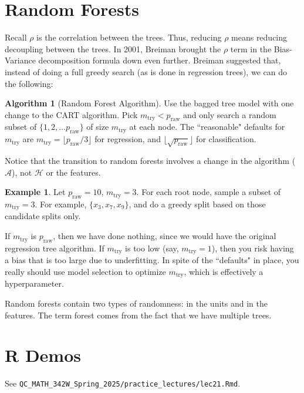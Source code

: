 \documentclass[12pt, a4paper]{article}
\theoremstyle{definition}
\newtheorem*{example}{Example}
\newtheorem{algorithm}{Algorithm}
\begin{document}
	\section*{Random Forests}
	Recall $\rho$ is the correlation between the trees. Thus, reducing $\rho$ means
	reducing decoupling between the trees. In 2001, Breiman brought the $\rho$ term in
	the Bias-Variance decomposition formula down even further. Breiman suggested that,
	instead of doing a full greedy search (as is done in regression trees), we can do
	the following:
	\begin{tcolorbox}
		\begin{algorithm}[Random Forest Algorithm]
			Use the bagged tree model with one change to the CART algorithm.
			Pick $m_{\text{try}} < p_{\text{raw}}$ and only search a random subset
			of $\{1,2,\ldots p_{\text{raw}}\}$ of size $m_{\text{try}}$ at each node.
			The ``reasonable" defaults for $m_{\text{try}}$ are
			$m_{\text{try}} = \lfloor p_{\text{raw}}/3\rfloor$ for regression,
			and $\lfloor \sqrt{p_{\text{raw}}}\rfloor$ for classification.
		\end{algorithm}
	\end{tcolorbox}
	Notice that the transition to random forests involves a change in the algorithm
	($\mathcal{A}$), not $\mathcal{H}$ or the features.
	\begin{tcolorbox}
		\begin{example}
			Let $p_{\text{raw}} = 10$, $m_{\text{try}} = 3$. For each root node,
			sample a subset of $m_{\text{try}} = 3$. For example, $\{x_3, x_7, x_9\}$,
			and do a greedy split based on those candidate splits only.
		\end{example}
	\end{tcolorbox}
	If $m_{\text{try}}$ is $p_{\text{raw}}$, then we have done nothing,
	since we would have the original regression tree algorithm. If $m_{\text{try}}$ is too
	low (say, $m_{\text{try}} = 1$), then you risk having a bias that is too large
	due to underfitting. In spite of the ``defaults" in place, you really should
	use model selection to optimize $m_{\text{try}}$, which is effectively a hyperparameter.
	
	Random forests contain two types of randomness: in the units and in the features.
	The term forest comes from the fact that we have multiple trees.
	\section*{R Demos}
	See \verb|QC_MATH_342W_Spring_2025/practice_lectures/lec21.Rmd|.
\end{document}
